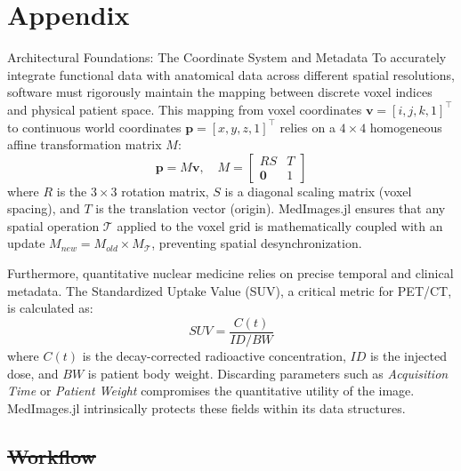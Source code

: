 \documentclass[a4paper,10pt]{article}
\makeatletter
\providecommand{\DIFdeltex}[1]{{\protect\color{red}\sout{#1}}} %
\providecommand{\DIFdelbegin}{} %
\providecommand{\DIFdelend}{} %
\providecommand{\DIFdel}[1]{\texorpdfstring{\DIFdeltex{#1}}{}} %
\providecommand{\DIFscaledelfig}{0.5}
\newlength{\DIFdelgraphicswidth} %
\newlength{\DIFdelgraphicsheight} %
\providecommand{\DIFdelincludegraphics}[2][]{%
\sbox{\DIFdelgraphicsbox}{\DIFOincludegraphics[#1]{#2}}%
\settoboxwidth{\DIFdelgraphicswidth}{\DIFdelgraphicsbox} %
\settoboxtotalheight{\DIFdelgraphicsheight}{\DIFdelgraphicsbox} %
\scalebox{\DIFscaledelfig}{%
\parbox[b]{\DIFdelgraphicswidth}{\usebox{\DIFdelgraphicsbox}\\[-\baselineskip] \rule{\DIFdelgraphicswidth}{0em}}\llap{\resizebox{\DIFdelgraphicswidth}{\DIFdelgraphicsheight}{%
\setlength{\unitlength}{\DIFdelgraphicswidth}%
\begin{picture}(1,1)%
\thicklines\linethickness{2pt} %
{\color[rgb]{1,0,0}\put(0,0){\framebox(1,1){}}}%
{\color[rgb]{1,0,0}\put(0,0){\line( 1,1){1}}}%
{\color[rgb]{1,0,0}\put(0,1){\line(1,-1){1}}}%
\end{picture}%
}\hspace*{3pt}}} %
} %
\DeclareRobustCommand{\DIFdelbegin}{\DIFOdelbegin \let\includegraphics\DIFdelincludegraphics} %
\DeclareRobustCommand{\DIFdelend}{\DIFOaddend \let\includegraphics\DIFOincludegraphics} %
\let\sout@orig\sout %
\renewcommand{\sout}[1]{\ifmmode\text{\sout@orig{\ensuremath{#1}}}\else\sout@orig{#1}\fi} %
\makeatother
\begin{document}
\DIFdelend \section{Appendix}

Architectural Foundations: The Coordinate System and Metadata
To accurately integrate functional data with anatomical data across different spatial resolutions, software must rigorously maintain the mapping between discrete voxel indices and physical patient space. This mapping from voxel coordinates $\mathbf{v} = [i, j, k, 1]^\top$ to continuous world coordinates $\mathbf{p} = [x, y, z, 1]^\top$ relies on a $4 \times 4$ homogeneous affine transformation matrix $M$:
\begin{equation}
\mathbf{p} = M \mathbf{v}, \quad M = 
\begin{bmatrix} 
R S & T \\
\mathbf{0} & 1
\end{bmatrix}
\end{equation}
where $R$ is the $3 \times 3$ rotation matrix, $S$ is a diagonal scaling matrix (voxel spacing), and $T$ is the translation vector (origin). MedImages.jl ensures that any spatial operation $\mathcal{T}$ applied to the voxel grid is mathematically coupled with an update $M_{new} = M_{old} \times M_{\mathcal{T}}$, preventing spatial desynchronization.

Furthermore, quantitative nuclear medicine relies on precise temporal and clinical metadata. The Standardized Uptake Value (SUV), a critical metric for PET/CT, is calculated as:
\begin{equation}
SUV = \frac{C(t)}{ID / BW}
\end{equation}
where $C(t)$ is the decay-corrected radioactive concentration, $ID$ is the injected dose, and $BW$ is patient body weight. Discarding parameters such as \textit{Acquisition Time} or \textit{Patient Weight} compromises the quantitative utility of the image. MedImages.jl intrinsically protects these fields within its data structures.

\DIFdelbegin \subsection{\DIFdel{Workflow}}
\addtocounter{subsection}{-1}%

\end{document}
